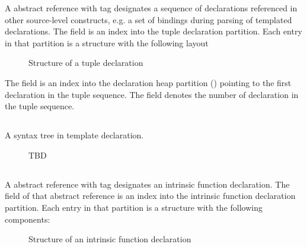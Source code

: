 A  abstract reference with tag  designates a sequence
of declarations referenced in other source-level constructs, e.g. a set of bindings during 
parsing of templated declarations.  The  field is an index into the
tuple declaration partition.  Each entry in that partition is a structure with the following
layout
%
\begin{figure}[H]
	\centering
	\caption{Structure of a tuple declaration}
	\label{fig:ifc-tuple-declaration-structure}
\end{figure}
%
The  field is an index into the declaration heap 
partition () pointing to the first declaration in 
the tuple sequence.  The  field
denotes the number of declaration in the tuple sequence.




\subsection{}
\label{sec:ifc:DeclSort:SyntaxTree}

A syntax tree in template declaration.
\begin{figure}[H]
	\centering
	TBD
\end{figure}




\subsection{} 
\label{sec:ifc:DeclSort:Intrinsic}

A  abstract reference with tag  designates an intrinsic function declaration.
The  field of that abstract reference is an index into the intrinsic function declaration partition.
Each entry in that partition is a structure with the following components:
%
\begin{figure}[H]
	\centering
	\caption{Structure of an intrinsic function declaration}
	\label{fig:ifc-intrinsic-decl-structure}
\end{figure}
%

